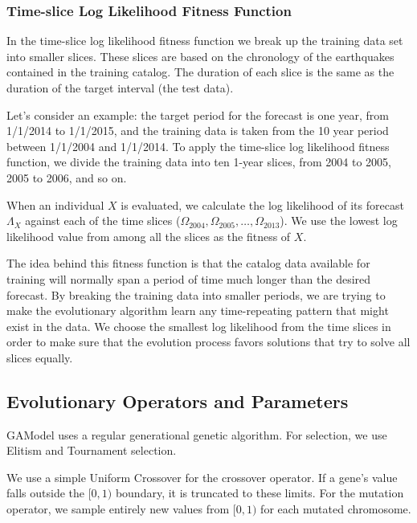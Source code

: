 \documentclass[a4paper,twoside]{article}
\begin{document}
\subsubsection{Time-slice Log Likelihood Fitness Function}

In the time-slice log likelihood fitness function we break up the
training data set into smaller slices. These slices are based on the
chronology of the earthquakes contained in the training catalog. The
duration of each slice is the same as the duration of the target
interval (the test data).

Let's consider an example: the target period for the forecast is one
year, from 1/1/2014 to 1/1/2015, and the training data is taken from
the 10 year period between 1/1/2004 and 1/1/2014. To apply the
time-slice log likelihood fitness function, we divide the training
data into ten 1-year slices, from 2004 to 2005, 2005 to 2006, and so
on.

When an individual $X$ is evaluated, we calculate the log likelihood
of its forecast $\Lambda_X$ against each of the time slices
($\Omega_{2004}, \Omega_{2005}, \dots, \Omega_{2013}$). We use the
lowest log likelihood value from among all the slices as the fitness
of $X$.

The idea behind this fitness function is that the catalog data
available for training will normally span a period of time much longer
than the desired forecast. By breaking the training data into smaller
periods, we are trying to make the evolutionary algorithm learn any
time-repeating pattern that might exist in the data. We choose the
smallest log likelihood from the time slices in order to make sure
that the evolution process favors solutions that try to solve all
slices equally.

\subsection{Evolutionary Operators and Parameters}

GAModel uses a regular generational genetic algorithm. For selection,
we use Elitism and Tournament selection.

We use a simple Uniform Crossover for the crossover operator. If a
gene's value falls outside the $[0,1)$ boundary, it is truncated to
  these limits. For the mutation operator, we sample entirely new
  values from $[0,1)$ for each mutated chromosome.
\end{document}
